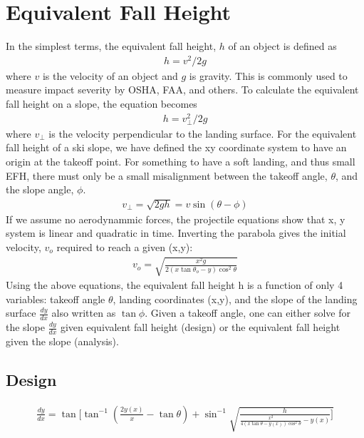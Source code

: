 \documentclass{article}
\begin{document}
\section{Equivalent Fall Height}
%
In the simplest terms, the equivalent fall height, $h$ of an object is defined
as
\begin{align}
  h = v^2/2g
  \label{eq:efh_general}
\end{align}
where $v$ is the velocity of an object and $g$ is gravity. This is commonly
used to measure impact severity by OSHA, FAA, and others. To calculate the
equivalent fall height on a slope, the equation becomes
\begin{align}
  h = v_{\perp}^2/2g
  \label{eq:efh_slope}
\end{align}
where $v_{\perp}$ is the velocity perpendicular to the landing surface. For the
equivalent fall height of a ski slope, we have defined the xy coordinate system
to have an origin at the takeoff point. For something to have a soft landing,
and thus small EFH, there must only be a small misalignment between the takeoff
angle, $\theta$, and the slope angle, $\phi$.
\begin{align}
  v_{\perp} = \sqrt{2gh} = v\sin(\theta - \phi)
\end{align}
If we assume no aerodynammic forces, the projectile equations show that x, y
system is linear and quadratic in time. Inverting the parabola gives the
initial velocity, $v_o$ required to reach a given (x,y):
\begin{align}
  v_o = \sqrt{\frac{x^2g}{2(x \tan \theta_o -y)\cos^{2}\theta}}
\end{align}
Using the above equations, the equivalent fall height h is a function of only 4
variables: takeoff angle $\theta$, landing coordinates (x,y), and the slope of
the landing surface $\frac{dy}{dx}$ also written as $\tan\phi$. Given a takeoff
angle, one can either solve for the slope $\frac{dy}{dx}$ given equivalent fall
height (design) or the equivalent fall height given the slope (analysis).

\subsection{Design}

\begin{align}
  \frac{dy}{dx} = \tan[\tan^{-1}(\frac{2y(x)}{x} - \tan\theta) +
    \sin^{-1}\sqrt{\frac{h}{\frac{x^2}{4(x\tan\theta -
    y(x))\cos^{2}\theta} - y(x)}]}
\end{align}
\end{document}
